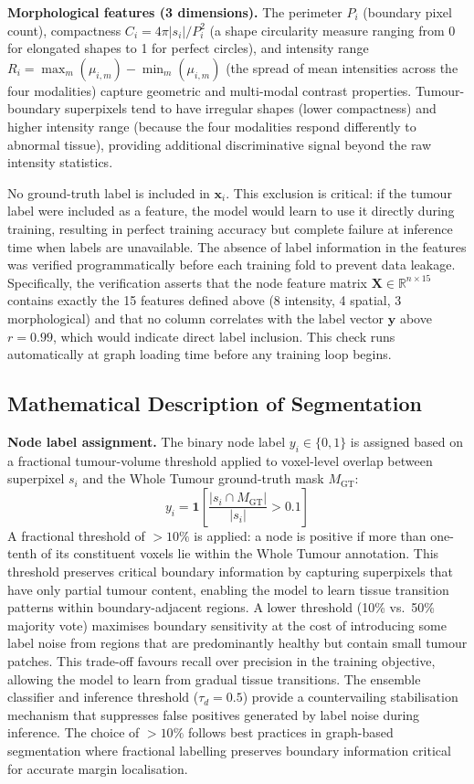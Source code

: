 \documentclass{article}
\begin{document}
\textbf{Morphological features (3 dimensions).} The perimeter $P_i$ (boundary
pixel count), compactness $C_i = 4\pi|s_i|/P_i^2$ (a shape circularity measure
ranging from 0 for elongated shapes to 1 for perfect circles), and intensity range
$R_i = \max_{m}(\mu_{i,m}) - \min_m(\mu_{i,m})$ (the spread of mean intensities
across the four modalities) capture geometric and multi-modal contrast properties.
Tumour-boundary superpixels tend to have irregular shapes (lower compactness) and
higher intensity range (because the four modalities respond differently to abnormal
tissue), providing additional discriminative signal beyond the raw intensity
statistics.

No ground-truth label is included in $\mathbf{x}_i$. This exclusion is critical:
if the tumour label were included as a feature, the model would learn to use it
directly during training, resulting in perfect training accuracy but complete
failure at inference time when labels are unavailable. The absence of label
information in the features was verified programmatically before each training
fold to prevent data leakage. Specifically, the verification asserts that the
node feature matrix $\mathbf{X} \in \mathbb{R}^{n \times 15}$ contains exactly
the 15 features defined above (8 intensity, 4 spatial, 3 morphological) and that
no column correlates with the label vector $\mathbf{y}$ above $r = 0.99$, which
would indicate direct label inclusion. This check runs automatically at graph
loading time before any training loop begins.

\subsection{Mathematical Description of Segmentation}
\label{sec:mathseg}

\textbf{Node label assignment.}
The binary node label $y_i \in \{0,1\}$ is assigned based on a fractional
tumour-volume threshold applied to voxel-level overlap between superpixel $s_i$ and the
Whole Tumour ground-truth mask $M_{\text{GT}}$:
\[
    y_i = \mathbf{1}\!\left[
        \frac{|s_i \cap M_{\text{GT}}|}{|s_i|} > 0.1
    \right]
\]
A fractional threshold of $>10\%$ is applied: a node is positive if more than one-tenth
of its constituent voxels lie within the Whole Tumour annotation. This threshold
preserves critical boundary information by capturing superpixels that have only partial
tumour content, enabling the model to learn tissue transition patterns within
boundary-adjacent regions. A lower threshold (10\% vs.~50\% majority vote) maximises
boundary sensitivity at the cost of introducing some label noise from regions that are
predominantly healthy but contain small tumour patches. This trade-off favours recall
over precision in the training objective, allowing the model to learn from gradual
tissue transitions. The ensemble classifier and inference threshold ($\tau_d = 0.5$)
provide a countervailing stabilisation mechanism that suppresses false positives
generated by label noise during inference. The choice of $>10\%$ follows best
practices in graph-based segmentation where fractional labelling preserves boundary
information critical for accurate margin localisation.
\end{document}
